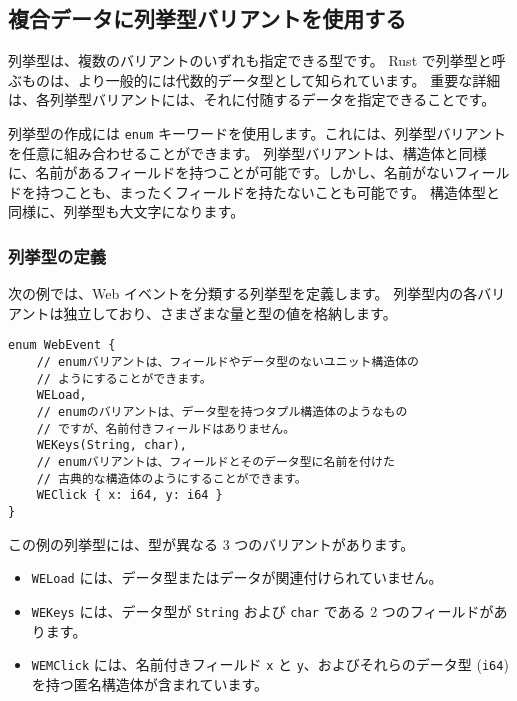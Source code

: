 \subsection{複合データに列挙型バリアントを使用する}

列挙型は、複数のバリアントのいずれも指定できる型です。 Rust で列挙型と呼ぶものは、より一般的には代数的データ型として知られています。 重要な詳細は、各列挙型バリアントには、それに付随するデータを指定できることです。

列挙型の作成には \texttt{enum} キーワードを使用します。これには、列挙型バリアントを任意に組み合わせることができます。 列挙型バリアントは、構造体と同様に、名前があるフィールドを持つことが可能です。しかし、名前がないフィールドを持つことも、まったくフィールドを持たないことも可能です。 構造体型と同様に、列挙型も大文字になります。


\subsubsection{列挙型の定義}

次の例では、Web イベントを分類する列挙型を定義します。 列挙型内の各バリアントは独立しており、さまざまな量と型の値を格納します。



\begin{lstlisting}[numbers=none]
enum WebEvent {
    // enumバリアントは、フィールドやデータ型のないユニット構造体の
    // ようにすることができます。
    WELoad,
    // enumのバリアントは、データ型を持つタプル構造体のようなもの
    // ですが、名前付きフィールドはありません。
    WEKeys(String, char),
    // enumバリアントは、フィールドとそのデータ型に名前を付けた
    // 古典的な構造体のようにすることができます。
    WEClick { x: i64, y: i64 }
}
\end{lstlisting}

この例の列挙型には、型が異なる 3 つのバリアントがあります。

\begin{itemize}
\item \texttt{WELoad} には、データ型またはデータが関連付けられていません。
\item \texttt{WEKeys} には、データ型が \texttt{String} および \texttt{char} である 2 つのフィールドがあります。
\item \texttt{WEMClick} には、名前付きフィールド \texttt{x} と \texttt{y}、およびそれらのデータ型 (\texttt{i64}) を持つ匿名構造体が含まれています。
\end{itemize}

